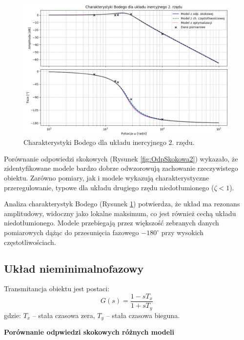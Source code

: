 \documentclass[12pt,a4paper]{article}
\begin{document}
	\begin{figure}[H]
		\centering
		\includegraphics[width=1\linewidth]{zdjecia/bode2rzad.png}
		\caption{Charakterystyki Bodego dla układu inercyjnego 2. rzędu.}
		\label{fig:Body2}
	\end{figure}
	
	Porównanie odpowiedzi skokowych (Rysunek \ref{fig:OdpSkokowa2}) wykazało, że zidentyfikowane modele bardzo dobrze odwzorowują zachowanie rzeczywistego obiektu. Zarówno pomiary, jak i modele wykazują charakterystyczne przeregulowanie, typowe dla układu drugiego rzędu niedotłumionego (\(\zeta < 1\)).
	
	Analiza charakterystyk Bodego (Rysunek \ref{fig:Body2}) potwierdza, że układ ma rezonans amplitudowy, widoczny jako lokalne maksimum, co jest również cechą układu niedotłumionego. Modele przebiegają przez większość zebranych danych pomiarowych dążąc do przesunięcia fazowego $-180^\circ$ przy wysokich częstotliwościach.
	
	\subsection{Układ nieminimalnofazowy}
	Transmitancja obiektu jest postaci:
	\begin{equation}
		G(s) = \frac{1-sT_x}{1+sT_y}
	\end{equation}
	gdzie: \(T_x\) – stała czasowa zera, \(T_y\) – stała czasowa bieguna.
	
	\textbf{Porównanie odpwiedzi skokowych różnych modeli}
	
\end{document}
